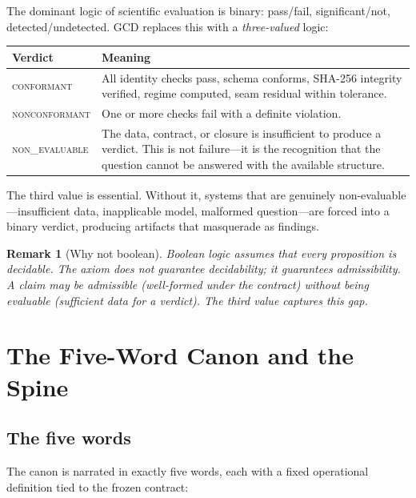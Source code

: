\documentclass[
  aps,
  prd,
  twocolumn,
  superscriptaddress,
  nofootinbib,
  floatfix
]{revtex4-2}
\newtheorem{remark}{Remark}
\newcommand{\regime}[1]{\textrm{\scshape#1}}
\newcommand{\conform}{\regime{conformant}}
\newcommand{\nonconform}{\regime{nonconformant}}
\begin{document}
The dominant logic of scientific evaluation is binary: pass/fail,
significant/not, detected/undetected.  GCD replaces this with a
\emph{three-valued} logic:

\begin{center}
\begin{tabular}{@{}lP{5cm}@{}}
\toprule
Verdict & Meaning \\
\midrule
\conform{} &
  All identity checks pass, schema conforms, SHA-256 integrity
  verified, regime computed, seam residual within tolerance. \\[0.3em]
\nonconform{} &
  One or more checks fail with a definite violation. \\[0.3em]
\regime{non\_evaluable} &
  The data, contract, or closure is insufficient to produce a
  verdict.  This is not failure---it is the recognition that the
  question cannot be answered with the available structure. \\
\bottomrule
\end{tabular}
\end{center}

The third value is essential.  Without it, systems that are
genuinely non-evaluable---insufficient data, inapplicable model,
malformed question---are forced into a binary verdict, producing
artifacts that masquerade as findings.

\begin{remark}[Why not boolean]
Boolean logic assumes that every proposition is decidable.  The
axiom does not guarantee decidability; it guarantees
\emph{admissibility}.  A claim may be admissible (well-formed under
the contract) without being evaluable (sufficient data for a
verdict).  The third value captures this gap.
\end{remark}


\section{The Five-Word Canon and the Spine}\label{sec:canon}

\subsection{The five words}

The canon is narrated in exactly five words, each with a fixed
operational definition tied to the frozen contract:
\end{document}
